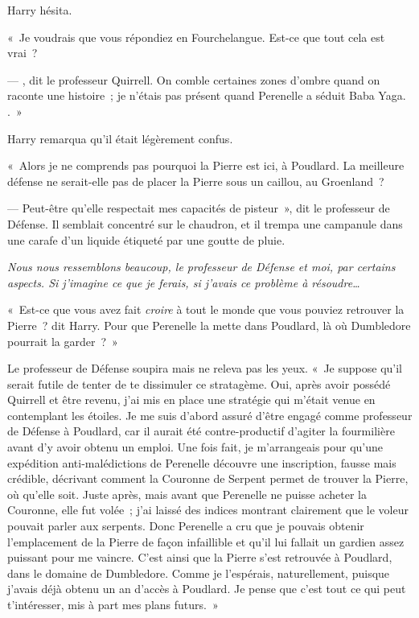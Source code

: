 Harry hésita.

«~Je voudrais que vous répondiez en Fourchelangue.
Est-ce que tout cela est vrai~?

--- , dit le professeur Quirrell.
On comble certaines zones d'ombre quand on raconte une histoire~; je n'étais pas présent quand Perenelle a séduit Baba Yaga.
.~»

Harry remarqua qu'il était légèrement confus.

«~Alors je ne comprends pas pourquoi la Pierre est ici, à Poudlard.
La meilleure défense ne serait-elle pas de placer la Pierre sous un caillou, au Groenland~?

--- Peut-être qu'elle respectait mes capacités de pisteur~», dit le professeur de Défense.
Il semblait concentré sur le chaudron, et il trempa une campanule dans une carafe d'un liquide étiqueté par une goutte de pluie.

\emph{Nous nous ressemblons beaucoup, le professeur de Défense et moi, par certains aspects.
Si j'imagine ce que je ferais, si j'avais ce problème à résoudre…}

«~Est-ce que vous avez fait \emph{croire} à tout le monde que vous pouviez retrouver la Pierre~? dit Harry.
Pour que Perenelle la mette dans Poudlard, là où Dumbledore pourrait la garder~?~»

Le professeur de Défense soupira mais ne releva pas les yeux.
«~Je suppose qu'il serait futile de tenter de te dissimuler ce stratagème.
Oui, après avoir possédé Quirrell et être revenu, j'ai mis en place une stratégie qui m'était venue en contemplant les étoiles.
Je me suis d'abord assuré d'être engagé comme professeur de Défense à Poudlard, car il aurait été contre-productif d'agiter la fourmilière avant d'y avoir obtenu un emploi.
Une fois fait, je m'arrangeais pour qu'une expédition anti-malédictions de Perenelle découvre une inscription, fausse mais crédible, décrivant comment la Couronne de Serpent permet de trouver la Pierre, où qu'elle soit.
Juste après, mais avant que Perenelle ne puisse acheter la Couronne, elle fut volée~; j'ai laissé des indices montrant clairement que le voleur pouvait parler aux serpents.
Donc Perenelle a cru que je pouvais obtenir l'emplacement de la Pierre de façon infaillible et qu'il lui fallait un gardien assez puissant pour me vaincre.
C'est ainsi que la Pierre s'est retrouvée à Poudlard, dans le domaine de Dumbledore.
Comme je l'espérais, naturellement, puisque j'avais déjà obtenu un an d'accès à Poudlard.
Je pense que c'est tout ce qui peut t'intéresser, mis à part mes plans futurs.~»

